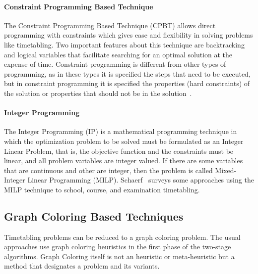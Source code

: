 \paragraph{Constraint Programming Based Technique}
The Constraint Programming Based Technique (CPBT) allows direct programming with constraints which gives ease and flexibility in solving problems like timetabling. Two important features about this technique are backtracking and logical variables that facilitate searching for an optimal solution at the expense of time. Constraint programming is different from other types of programming, as in these types it is specified the steps that need to be executed, but in constraint programming it is specified the properties (hard constraints) of the solution or properties that should not be in the solution~\cite{Qu2009}.\\

\paragraph{Integer Programming}
The Integer Programming (IP) is a mathematical programming technique in which the optimization problem to be solved must be formulated as an Integer Linear Problem, that is, the objective function and the constraints must be linear, and all problem variables are integer valued. If there are some variables that are continuous and other are integer, then the problem is called Mixed-Integer Linear Programming (MILP). Schaerf~\cite{Schaerf1999} surveys some approaches using the MILP technique to school, course, and examination timetabling.

\subsection{Graph Coloring Based Techniques}
\label{subsection:graphcoloring}
Timetabling problems can be reduced to a graph coloring problem. The usual approaches use graph coloring heuristics in the first phase of the two-stage algorithms. Graph Coloring itself is not an heuristic or meta-heuristic but a method that designates a problem and its variants.\\

